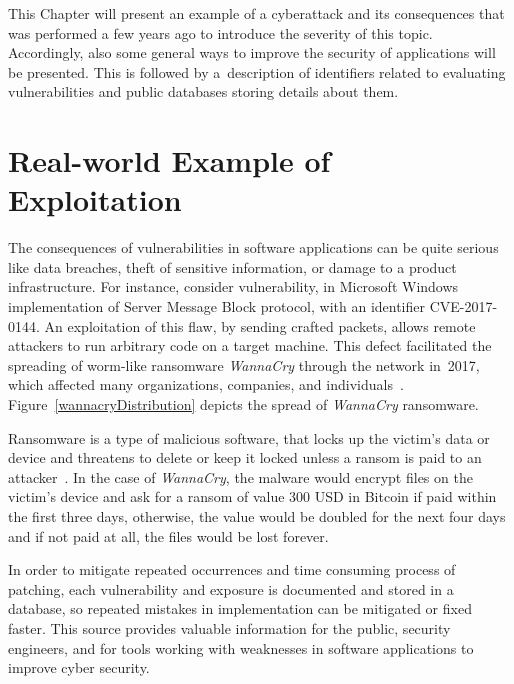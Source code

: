   This Chapter will present an example of a cyberattack and its consequences that was performed a few years ago
  to introduce the severity of this topic. Accordingly, also some general ways to improve the security of applications
  will be presented. This is followed by a~description of identifiers related to evaluating vulnerabilities
  and public databases storing details about them.

  \section{Real-world Example of Exploitation}
  The consequences of vulnerabilities in software applications can be quite serious like data breaches,
  theft of sensitive information, or damage to a product infrastructure. For instance, consider
  vulnerability, in Microsoft Windows implementation of Server Message Block protocol, with an identifier
  CVE-2017-0144. An exploitation of this flaw, by sending crafted packets, allows remote attackers to run
  arbitrary code on a target machine. This defect facilitated the spreading of worm-like ransomware
  \emph{WannaCry} through the network in~2017, which affected many organizations, companies,
  and individuals~\cite{WannaCry}. Figure~\ref{wannacryDistribution} depicts the spread of \emph{WannaCry} ransomware.

  Ransomware is a type of malicious software, that locks up the victim's data or device and threatens to delete
  or keep it locked unless a ransom is paid to an attacker~\cite{Malware}. In the case of \emph{WannaCry},
  the malware would encrypt files on the victim's device and ask for a ransom of value 300 USD in Bitcoin
  if paid within the first three days, otherwise, the value would be doubled for the next four days and if
  not paid at all, the files would be lost forever.

  In order to mitigate repeated occurrences and time consuming process of patching, each
  vulnerability and exposure is documented and stored in a database, so repeated mistakes in implementation
  can be mitigated or fixed faster. This source provides valuable information for the public,
  security engineers, and for tools working with weaknesses in software applications to improve
  cyber security.

